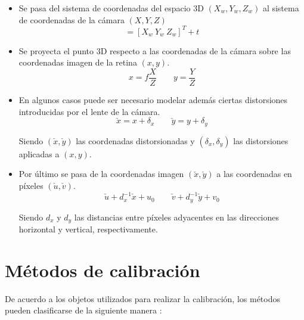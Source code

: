 \begin{itemize}
\item Se pasa del sistema de coordenadas del espacio 3D $(X_w, Y_w, Z_w)$ al sistema de coordenadas de la cámara $(X,Y, Z)$
\begin{equation}
[X \ Y \ Z] = [X_w \ Y_w \ Z_w]^T + t
\end{equation}
\item Se proyecta el punto 3D respecto a las coordenadas de la cámara sobre las coordenadas imagen de la retina $(x,y)$.
\begin{equation}
x=f \dfrac{X}{Z} \qquad y = \dfrac{Y}{Z}
\end{equation}
\item En algunos casos puede ser necesario modelar además ciertas distorsiones introducidas por el lente de la cámara.
\begin{equation}
\check{x} = x + \delta_x \qquad \check{y} = y + \delta_y
\end{equation}

Siendo $(\check{x},\check{y})$ las coordenadas distorsionadas y $(\delta_x, \delta_y)$ las distorsiones aplicadas a $(x,y)$.

\item Por último se pasa de la coordenadas imagen $(\check{x}, \check{y})$ a las coordenadas en píxeles $(\check{u}, \check{v})$.
\vspace{-0.05cm}
\begin{equation}
\check{u} + d_x ^{-1}\check{x} + u_0 \qquad \check{v} + d_y ^{-1}\check{y} + v_0
\end{equation}

Siendo $d_x$ y $d_y$ las distancias entre píxeles adyacentes en las direcciones horizontal y vertical, respectivamente.\\
\end{itemize}


\section{Métodos de calibración}

De acuerdo a los objetos utilizados para realizar la calibración, los métodos pueden clasificarse de la siguiente manera \cite{zhang_libro}:\\

